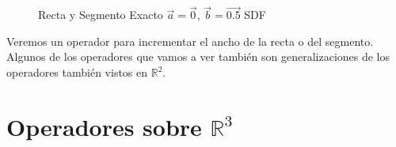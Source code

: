 \begin{figure}[H]
  \centering
  \captionsetup{justification=centering}%
  \hfill
  \caption{Recta y Segmento Exacto \(\Vec{a}=\Vec{0}\), \(\Vec{b}=\Vec{0.5}\) SDF}
\end{figure}

Veremos un operador para incrementar el ancho de la recta o del segmento. Algunos de los operadores que vamos a ver también son generalizaciones de los operadores también  vistos en \(\mathbb{R}^2\).

\section{Operadores sobre \(\mathbb{R}^3\)}

